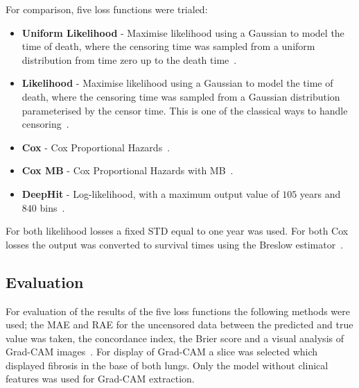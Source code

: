         For comparison, five loss functions were trialed:

        \begin{itemize}
            \item \textbf{Uniform Likelihood} - Maximise likelihood using a Gaussian to model the time of death, where the censoring time was sampled from a uniform distribution from time zero up to the death time~\cite{Shahin2023DeepAnalysis}.

            \item \textbf{Likelihood} - Maximise likelihood using a Gaussian to model the time of death, where the censoring time was sampled from a Gaussian distribution parameterised by the censor time. This is one of the classical ways to handle censoring~\cite{Lee2018DeepHit:Risks}.

            \item \textbf{Cox} - Cox Proportional Hazards~\cite{Cox1972RegressionLife-Tables}.

            \item \textbf{Cox \gls{MB}} - Cox Proportional Hazards with \gls{MB}~\cite{Shahin2022SurvivalData}.

            \item \textbf{DeepHit} - Log-likelihood, with a maximum output value of $105$ years and $840$ bins~\cite{Lee2018DeepHit:Risks}.
        \end{itemize}

        For both likelihood losses a fixed \gls{STD} equal to one year was used. For both Cox losses the output was converted to survival times using the Breslow estimator~\cite{Breslow1974CovarianceData}.

    \vspace{-0.5cm}

    \subsection{Evaluation} \label{sec:evaluation}
        For evaluation of the results of the five loss functions the following methods were used; the \gls{MAE} and \gls{RAE} for the uncensored data between the predicted and true value was taken, the concordance index, the Brier score and a visual analysis of Grad-CAM images~\cite{Raykar2008OnIndex, Gerds2006ConsistentTimes, Selvaraju2020Grad-CAM:Localization}. For display of Grad-CAM a slice was selected which displayed fibrosis in the base of both lungs. Only the model without clinical features was used for Grad-CAM extraction.
